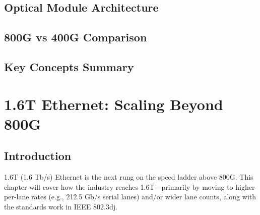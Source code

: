 \documentclass[openany]{tufte-book}
\begin{document}
\section{Optical Module Architecture}


\section{800G vs 400G Comparison}


\section{Key Concepts Summary}



\chapter{1.6T Ethernet: Scaling Beyond 800G}


\section{Introduction}

1.6T (1.6 Tb/s) Ethernet is the next rung on the speed ladder above 800G. This
chapter will cover how the industry reaches 1.6T---primarily by moving to
higher per-lane rates (e.g., 212.5 Gb/s serial lanes) and/or wider lane counts,
along with the standards work in IEEE 802.3dj.

\end{document}
